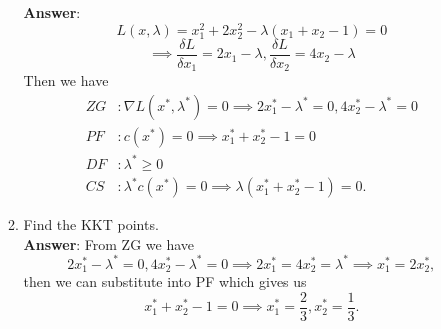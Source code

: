 \documentclass{article}
\begin{document}
\begin{enumerate}
\begin{enumerate}
                    \textbf{Answer}: \[
                        L(x,\lambda)=x_1^2+2x_2^2-\lambda(x_1+x_2-1)=0\]\[\implies\frac{\delta L}{\delta x_1}=2x_1-\lambda,\frac{\delta L}{\delta x_2}=4x_2-\lambda
                    \] Then we have \begin{align*}
                        ZG & : \nabla L(x^*,\lambda^*)=0\implies 2x^*_1-\lambda^*=0,4x^*_2-\lambda^*=0 \\
                        PF & : c(x^*)=0\implies x^*_1+x^*_2-1=0                                        \\
                        DF & : \lambda^*\geq 0                                                         \\
                        CS & : \lambda^*c(x^*)=0\implies\lambda(x^*_1+x^*_2-1)=0.
                    \end{align*}
              \item Find the KKT points.\\
                    \textbf{Answer}: From ZG we have \[
                        2x^*_1-\lambda^*=0,4x^*_2-\lambda^*=0\implies 2x^*_1=4x^*_2=\lambda^*\implies x^*_1=2x^*_2,
                    \] then we can substitute into PF which gives us \[
                        x^*_1+x^*_2-1=0\implies x^*_1=\frac{2}{3},x^*_2=\frac{1}{3}.
                    \]
          \end{enumerate}
\end{enumerate}
\end{document}
